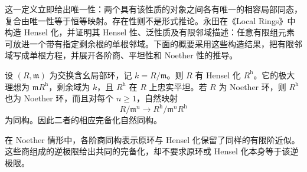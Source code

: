 这一定义立即给出唯一性：两个具有该性质的对象之间各有唯一的相容局部同态，复合由唯一性等于恒等映射。存在性则不是形式推论。永田在《Local Rings》中构造 Hensel 化，并证明其 Hensel 性、泛性质及有限邻域描述：任意有限组元素可放进一个带有指定剩余根的单根邻域\cite[\S43, (43.3), (43.5), (43.9), pp. 180--183]{Nagata1975LocalRings}。下面的概要采用这些构造结果，把有限邻域写成单根方程，并展开各阶商、平坦性和 Noether 性的推导。

\begin{theorem}\label{b3:thm:henselization-existence}
	设 \((R,\mathfrak m)\) 为交换含幺局部环，记 \(k=R/\mathfrak m\)。则 \(R\) 有 Hensel 化 \(R^{\mathrm h}\)。它的极大理想为 \(\mathfrak mR^{\mathrm h}\)，剩余域为 \(k\)，且 \(R^{\mathrm h}\) 在 \(R\) 上忠实平坦。若 \(R\) 为 Noether 环，则 \(R^{\mathrm h}\) 也为 Noether 环，而且对每个 \(n\ge1\)，自然映射
	\[
		R/\mathfrak m^n\longrightarrow R^{\mathrm h}/\mathfrak m^nR^{\mathrm h}
	\]
	为同构。因此二者的相应完备化自然同构。
\end{theorem}

在 Noether 情形中，各阶商同构表示原环与 Hensel 化保留了同样的有限阶近似。这些商组成的逆极限给出共同的完备化，却不要求原环或 Hensel 化本身等于该逆极限。


